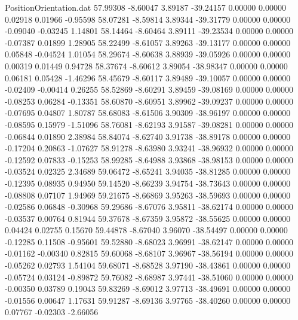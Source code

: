 \begin{filecontents}{PositionOrientation.dat}
  57.99308   -8.60047    3.89187   -39.24157    0.00000    0.00000    0.02918    0.01966   -0.95598
  58.07281   -8.59814    3.89344   -39.31779    0.00000    0.00000   -0.09040   -0.03245    1.14801
  58.14464   -8.60464    3.89111   -39.23534    0.00000    0.00000   -0.07387    0.01899    1.28905
  58.22499   -8.61057    3.89263   -39.13177    0.00000    0.00000    0.05848   -0.04524    1.01054
  58.29674   -8.60638    3.88939   -39.05926    0.00000    0.00000    0.00319    0.01449    0.94728
  58.37674   -8.60612    3.89054   -38.98347    0.00000    0.00000    0.06181    0.05428   -1.46296
  58.45679   -8.60117    3.89489   -39.10057    0.00000    0.00000   -0.02409   -0.00414    0.26255
  58.52869   -8.60291    3.89459   -39.08169    0.00000    0.00000   -0.08253    0.06284   -0.13351
  58.60870   -8.60951    3.89962   -39.09237    0.00000    0.00000   -0.07695    0.04807    1.80787
  58.68083   -8.61506    3.90309   -38.96197    0.00000    0.00000   -0.08595    0.15979   -1.51096
  58.76081   -8.62193    3.91587   -39.08281    0.00000    0.00000   -0.06844    0.01890    2.38984
  58.84074   -8.62740    3.91738   -38.89178    0.00000    0.00000   -0.17204    0.20863   -1.07627
  58.91278   -8.63980    3.93241   -38.96932    0.00000    0.00000   -0.12592    0.07833   -0.15253
  58.99285   -8.64988    3.93868   -38.98153    0.00000    0.00000   -0.03524    0.02325    2.34689
  59.06472   -8.65241    3.94035   -38.81285    0.00000    0.00000   -0.12395    0.08935    0.94950
  59.14520   -8.66239    3.94754   -38.73643    0.00000    0.00000   -0.08808    0.07107    1.94969
  59.21675   -8.66869    3.95263   -38.59693    0.00000    0.00000   -0.02586    0.06848   -0.30968
  59.29686   -8.67076    3.95811   -38.62174    0.00000    0.00000   -0.03537    0.00764    0.81944
  59.37678   -8.67359    3.95872   -38.55625    0.00000    0.00000    0.04424    0.02755    0.15670
  59.44878   -8.67040    3.96070   -38.54497    0.00000    0.00000   -0.12285    0.11508   -0.95601
  59.52880   -8.68023    3.96991   -38.62147    0.00000    0.00000   -0.01162   -0.00340    0.82815
  59.60068   -8.68107    3.96967   -38.56194    0.00000    0.00000   -0.05262    0.02793    1.54104
  59.68071   -8.68528    3.97190   -38.43861    0.00000    0.00000   -0.05724    0.03124   -0.89872
  59.76082   -8.68987    3.97441   -38.51060    0.00000    0.00000   -0.00350    0.03789    0.19043
  59.83269   -8.69012    3.97713   -38.49691    0.00000    0.00000   -0.01556    0.00647    1.17631
  59.91287   -8.69136    3.97765   -38.40260    0.00000    0.00000    0.07767   -0.02303   -2.66056

\end{filecontents}

